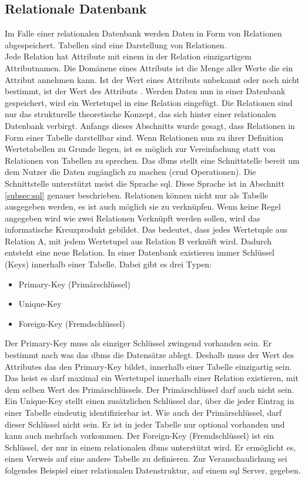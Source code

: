 \subsection{Relationale Datenbank}\label{subsec:relDB}
Im Falle einer relationalen Datenbank werden Daten in Form von Relationen abgespeichert.
Tabellen sind eine Darstellung von Relationen.\\
Jede Relation hat Attribute mit einem in der Relation einzigartigem Attributnamen.
Die Domänene eines Attributs ist die Menge aller Werte die ein Attribut annehmen kann.
Ist der Wert eines Attributs unbekannt oder noch nicht bestimmt, ist der Wert des Attributs  \citep{Studer:2016:2}.
Werden Daten nun in einer Datenbank gespeichert, wird ein Wertetupel in eine Relation eingefügt.
Die Relationen sind nur das strukturelle theoretische Konzept, das sich hinter einer relationalen Datenbank verbirgt.
Anfangs dieses Abschnitts wurde gesagt, dass Relationen in Form einer Tabelle darstellbar sind.
Wenn Relationen nun zu ihrer Definition Wertetabellen zu Grunde liegen, 
ist es möglich zur Vereinfachung statt von Relationen von Tabellen zu sprechen.
Das \ac{dbms} stellt eine Schnittstelle bereit um dem Nutzer die Daten zugänglich zu machen (\ac{crud} Operationen).
Die Schnittstelle unterstützt meist die Sprache \ac{sql}. Diese Sprache ist in Abschnitt \ref{subsec:sql} genauer beschrieben.
Relationen können nicht nur als Tabelle ausgegeben werden, es ist auch möglich sie zu verknüpfen.
Wenn keine Regel angegeben wird wie zwei Relationen Verknüpft werden sollen, wird das informatische Kreuzprodukt gebildet.
Das bedeutet, dass jedes Wertetuple aus Relation A, mit jedem Wertetupel aus Relation B verknüft wird. 
Dadurch entsteht eine neue Relation.
In einer Datenbank existieren immer Schlüssel (Keys) innerhalb einer Tabelle.
Dabei gibt es drei Typen:
\begin{itemize}
  \item Primary-Key (Primärschlüssel)
  \item Unique-Key
  \item Foreign-Key (Fremdschlüssel)
\end{itemize}
Der Primary-Key muss als einziger Schlüssel zwingend vorhanden sein. Er bestimmt nach was das \ac{dbms} die Datensätze ablegt.
Deshalb muss der Wert des Attributes das den Primary-Key bildet, innerhalb einer Tabelle einzigartig sein.
Das heist es darf maximal ein Wertetupel innerhalb einer Relation existieren, mit dem selben Wert des Primärschlüssels.
Der Primärschlüssel darf auch nicht  sein.
Ein Unique-Key stellt einen zusätzlichen Schlüssel dar, über die jeder Eintrag in einer Tabelle eindeutig identifizierbar ist.
Wie auch der Primärschlüssel, darf dieser Schlüssel nicht  sein.
Er ist in jeder Tabelle nur optional vorhanden und kann auch mehrfach vorkommen.
Der Foreign-Key (Fremdschlüssel) ist ein Schlüssel, der nur in einem relationalen \ac{dbms} unterstützt wird.
Er ermöglicht es, einen Verweis auf eine andere Tabelle zu definieren.
Zur Veranschaulichung sei folgendes Beispiel einer relationalen Datenstruktur,
auf einem \ac{sql} Server, gegeben.

